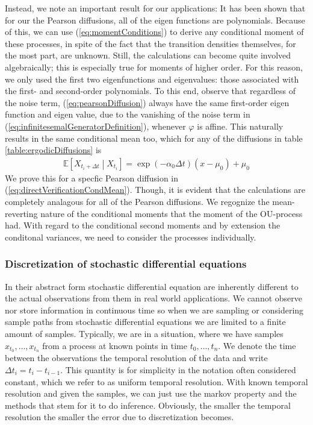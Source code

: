 Instead, we note an important result for our applications: It has been shown \cite{FormanSorensen2008} that for our the Pearson diffusions, all of the eigen functions are polynomials. Because of this, we can use (\ref{eq:momentConditions}) to derive any conditional moment of these processes, in spite of the fact that the transition densities themselves, for the most part, are unknown. Still, the calculations can become quite involved algebraically; this is especially true for moments of higher order. For this reason, we only used the first two eigenfunctions and eigenvalues: those associated with the first- and second-order polynomials. To this end, observe that regardless of the noise term, (\ref{eq:pearsonDiffusion}) always have the same first-order eigen function and eigen value, due to the vanishing of the noise term in (\ref{eq:infinitesemalGeneratorDefinition}), whenever $\varphi$ is affine. This naturally results in the same conditional mean too, which for any of the diffusions in table \ref{table:ergodicDiffusions} is
\begin{align}
    \mathbb{E}\left[X_{t_{i}+\Delta t} \middle|X_{t_{i}} \right] = \exp\left(-\alpha_0\Delta t\right)\left(x-\mu_0\right) + \mu_0
\end{align}
We prove this for a specfic Pearson diffusion in (\ref{eq:directVerificationCondMean}). Though, it is evident that the calculations are completely analagous for all of the Pearson diffusions. We regognize the mean-reverting nature of the conditional moments that the moment of the OU-process had. With regard to the conditional second moments and by extension the conditonal variances, we need to consider the processes individually.
\subsubsection{Discretization of stochastic differential equations}\label{subsubsec:Discretization}
In their abstract form stochastic differential equation are inherently different to the actual observations from them in real world applications.
We cannot observe nor store information in continuous time so when we are sampling or considering sample paths from stochastic differential equations we are limited to a finite amount of samples. Typically, we are in a situation, where we have samples $x_{t_0},\dots, x_{t_n}$ from a process at known points in time $t_0,\dots,t_n$. We denote the time between the observations the temporal resolution of the data and write $\Delta t_i = t_{i} - t_{i - 1}$. This quantity is for simplicity in the notation often considered constant, which we refer to as uniform temporal resolution. With known temporal resolution and given the samples, we can just use the markov property and the methods that stem for it to do inference. Obviously, the smaller the temporal resolution the smaller the error due to discretization becomes.

